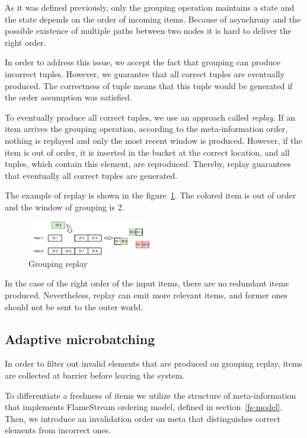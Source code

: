 \label {fs-collision}

As it was defined previously, only the grouping operation maintains a state and the state depends on the order of incoming items. Because of asynchrony and the possible existence of multiple paths between two nodes it is hard to deliver the right order.

In order to address this issue, we accept the fact that grouping can produce incorrect tuples. However, we guarantee that all correct tuples are eventually produced. The correctness of tuple means that this tuple would be generated if the order assumption was satisfied. 

To eventually produce all correct tuples, we use an approach called {\it replay}. If an item arrives the grouping operation, according to the meta-information order, nothing is replayed and only the most recent window is produced. However, if the item is out of order, it is inserted in the bucket at the correct location, and all tuples, which contain this element, are reproduced. Thereby, replay guarantees that eventually all correct tuples are generated.

The example of replay is shown in the figure~\ref{grouping-replaying}. The colored item is out of order and the window of grouping is 2.

\begin{figure}[htbp]
  \centering
  \includegraphics[width=0.48\textwidth]{pics/grouping-replaying}
  \caption{Grouping replay}
  \label {grouping-replaying}
\end{figure}

In the case of the right order of the input items, there are no redundant items produced.  Nevertheless, replay can emit more relevant items, and former ones should not be sent to the outer world.

\subsection{Adaptive microbatching}
In order to filter out invalid elements that are produced on grouping replay, items are collected at barrier before leaving the system.

To differentiate a freshness of items we utilize the structure of meta-information that implements FlameStream ordering model, defined in section~\ref{fs-model}. Then, we introduce an invalidation order on meta that distinguishes correct elements from incorrect ones.


